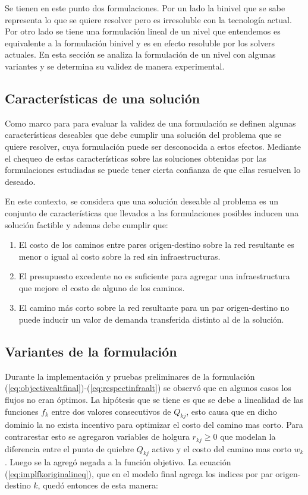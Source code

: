 \documentclass{article}
\begin{document}
  Se tienen en este punto dos formulaciones. Por un lado la binivel que se sabe representa lo que se quiere resolver pero es irresoluble con la tecnología actual. Por otro lado se tiene una formulación lineal de un nivel que entendemos es equivalente a la formulación binivel y es en efecto resoluble por los solvers actuales. En esta sección se analiza la formulación de un nivel con algunas variantes y se determina su validez de manera experimental.

  \subsection*{Características de una solución}

  Como marco para para evaluar la validez de una formulación se definen algunas características deseables que debe cumplir una solución del problema que se quiere resolver, cuya formulación puede ser desconocida a estos efectos. Mediante el chequeo de estas características sobre las soluciones obtenidas por las formulaciones estudiadas se puede tener cierta confianza de que ellas resuelven lo deseado.

  En este contexto, se considera que una solución deseable al problema es un conjunto de características que llevados a las formulaciones posibles inducen una solución factible y ademas debe cumplir que:

  \begin{enumerate}
    \item{El costo de los caminos entre pares origen-destino sobre la red resultante es menor o igual al costo sobre la red sin infraestructuras.}
    \item{\label{budgetexcess} El presupuesto excedente no es suficiente para agregar una infraestructura que mejore el costo de alguno de los caminos.}
    \item{El camino más corto sobre la red resultante para un par origen-destino no puede inducir un valor de demanda transferida distinto al de la solución.}
  \end{enumerate}

  \subsection*{Variantes de la formulación}

  Durante la implementación y pruebas preliminares de la formulación (\ref{eq:objectivealtfinal})-(\ref{eq:respectinfraalt}) se observó que en algunos casos los flujos no eran óptimos. La hipótesis que se tiene es que se debe a linealidad de las funciones $f_k$ entre dos valores consecutivos de $Q_{kj}$, esto causa que en dicho dominio la no exista incentivo para optimizar el costo del camino mas corto. Para contrarestar esto se agregaron variables de holgura $r_{kj} \geq 0$ que modelan la diferencia entre el punto de quiebre $Q_{kj}$ activo y el costo del camino mas corto $w_k$. Luego se la agregó negada a la función objetivo. La ecuación (\ref{eq:implfkoriginalineq}), que en el modelo final agrega los indices por par origen-destino $k$, quedó entonces de esta manera:
\end{document}
